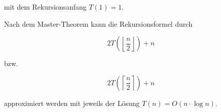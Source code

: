 \documentclass{lehramt-informatik-aufgabe}
\begin{document}
\begin{enumerate}
\begin{antwort}
mit dem Rekursionsanfang $T(1) = 1$.

Nach dem Master-Theorem kann die Rekursionsformel durch

\begin{displaymath}
2T\left(\left\lfloor\frac{n}{2}\right\rfloor\right) + n
\end{displaymath}

bzw.

\begin{displaymath}
2T\left(\left\lceil\frac{n}{2}\right\rceil\right) + n
\end{displaymath}

approximiert werden mit jeweils der Lösung $T(n) = O(n \cdot \log n)$.
\end{antwort}

\end{enumerate}
\end{document}
